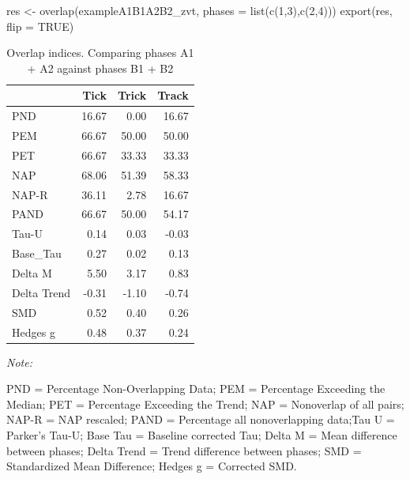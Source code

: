 \documentclass[
]{book}
\newenvironment{Shaded}{\begin{snugshade}}{\end{snugshade}}
\newcommand{\AttributeTok}[1]{\textcolor[rgb]{0.77,0.63,0.00}{#1}}
\newcommand{\ConstantTok}[1]{\textcolor[rgb]{0.00,0.00,0.00}{#1}}
\newcommand{\DecValTok}[1]{\textcolor[rgb]{0.00,0.00,0.81}{#1}}
\newcommand{\FunctionTok}[1]{\textcolor[rgb]{0.00,0.00,0.00}{#1}}
\newcommand{\NormalTok}[1]{#1}
\newcommand{\OtherTok}[1]{\textcolor[rgb]{0.56,0.35,0.01}{#1}}
\begin{document}
\begin{Shaded}
\begin{Highlighting}[]
\NormalTok{res }\OtherTok{\textless{}{-}} \FunctionTok{overlap}\NormalTok{(exampleA1B1A2B2\_zvt, }\AttributeTok{phases =} \FunctionTok{list}\NormalTok{(}\FunctionTok{c}\NormalTok{(}\DecValTok{1}\NormalTok{,}\DecValTok{3}\NormalTok{),}\FunctionTok{c}\NormalTok{(}\DecValTok{2}\NormalTok{,}\DecValTok{4}\NormalTok{)))}
\FunctionTok{export}\NormalTok{(res, }\AttributeTok{flip =} \ConstantTok{TRUE}\NormalTok{)}
\end{Highlighting}
\end{Shaded}

\begin{table}

\caption{\label{tab:unnamed-chunk-66}Overlap indices. Comparing phases A1 + A2 against phases B1 + B2}
\centering
\begin{threeparttable}
\begin{tabular}[t]{lrrr}
\toprule
  & Tick & Trick & Track\\
\midrule
PND & 16.67 & 0.00 & 16.67\\
PEM & 66.67 & 50.00 & 50.00\\
PET & 66.67 & 33.33 & 33.33\\
NAP & 68.06 & 51.39 & 58.33\\
NAP-R & 36.11 & 2.78 & 16.67\\
PAND & 66.67 & 50.00 & 54.17\\
Tau-U & 0.14 & 0.03 & -0.03\\
Base\_Tau & 0.27 & 0.02 & 0.13\\
Delta M & 5.50 & 3.17 & 0.83\\
Delta Trend & -0.31 & -1.10 & -0.74\\
SMD & 0.52 & 0.40 & 0.26\\
Hedges g & 0.48 & 0.37 & 0.24\\
\bottomrule
\end{tabular}
\begin{tablenotes}
\item \textit{Note: } 
\item PND = Percentage Non-Overlapping Data; PEM = Percentage Exceeding the Median; PET = Percentage Exceeding the Trend; NAP = Nonoverlap of all pairs; NAP-R = NAP rescaled; PAND = Percentage all nonoverlapping data;Tau U = Parker's Tau-U; Base Tau = Baseline corrected Tau; Delta M = Mean difference between phases; Delta Trend = Trend difference between phases; SMD = Standardized Mean Difference; Hedges g = Corrected SMD.
\end{tablenotes}
\end{threeparttable}
\end{table}
\end{document}
